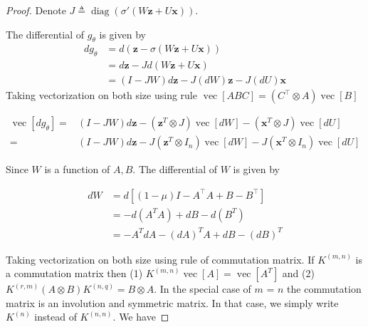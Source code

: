 \documentclass[twoside]{article}
\begin{document}
\begin{proof}
Denote $J \triangleq \operatorname{diag}(\sigma'(W\mathbf{z} + U\mathbf{x}))$.

The differential of $g_\theta$ is given by
$$
\begin{aligned} 
    d g_\theta &= d(\mathbf{z} - \sigma(W\mathbf{z} + U\mathbf{x})) \\ 
               &= d \mathbf{z} - J d(W \mathbf{z} + U \mathbf{x}) \\ 
               &= (I - J W)d\mathbf{z} - J(dW)\mathbf{z}  - J(dU)\mathbf{x} 
\end{aligned}
$$
Taking vectorization on both size using rule $\operatorname{vec}[ABC] =(C^\top \otimes A)\operatorname{vec}[B]$

\begin{align}
\label{eqn:proof_deri_g_0}
    \operatorname{vec}[d g_\theta] =& (I - JW) d \mathbf{z} - (\mathbf{z}^T \otimes J) \operatorname{vec}[dW] - (\mathbf{x} ^ T \otimes J) \operatorname{vec}[dU] \\
    =& (I - JW) d \mathbf{z} - J (\mathbf{z}^T \otimes I_n) \operatorname{vec}[dW] - J (\mathbf{x} ^ T \otimes I_n) \operatorname{vec}[dU]
\end{align}

Since $W$ is a function of $A, B$. The differential of $W$ is given by

$$
\begin{aligned}dW &= d\left[(1 - \mu)I - A^\top A + B - B^\top\right]  \\ &= -d(A^TA) + dB -d(B^T) \\ &= - A^T dA - (dA)^T A + dB - (dB)^T\end{aligned}
$$

Taking vectorization on both size using rule of commutation matrix. If $K^{(m,n)}$ is a commutation matrix then (1)  $K^{(m,n)}\operatorname{vec}[A]=\operatorname{vec}[A^T]$ and (2) $K^{(r, m)} (A \otimes B)K^{(n, q)}=B \otimes A$. In the special case of $m$ = $n$ the commutation matrix is an involution and symmetric matrix. In that case, we simply write $K^{(n)}$ instead of $K^{(n, n)}$. We have


\end{proof}
\end{document}
